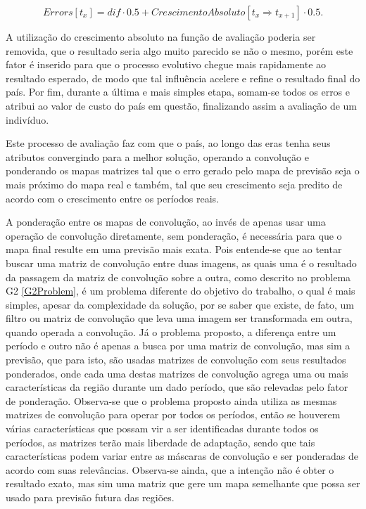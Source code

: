 \begin{equation}
\label{eq:forecastError}
	Errors[t_x] = dif \cdot 0.5 + CrescimentoAbsoluto[t_x \Rightarrow t_{x+1}] \cdot 0.5.
\end{equation}

	A utilização do crescimento absoluto na função de avaliação poderia ser removida, que o resultado seria algo muito parecido se não o mesmo, porém este fator é inserido para que o processo evolutivo chegue mais rapidamente ao resultado esperado, de modo que tal influência acelere e refine o resultado final do país. Por fim, durante a última e mais simples etapa, somam-se todos os erros e atribui ao valor de custo do país em questão, finalizando assim a avaliação de um indivíduo. 

Este processo de avaliação faz com que o país, ao longo das eras tenha seus atributos convergindo para a melhor solução, operando a convolução e ponderando os mapas matrizes tal que o erro gerado pelo mapa de previsão seja o mais próximo do mapa real e também, tal que seu crescimento seja predito de acordo com o crescimento entre os períodos reais. 

A ponderação entre os mapas de convolução, ao invés de apenas usar uma operação de convolução diretamente, sem ponderação, é necessária para que o mapa final resulte em uma previsão mais exata. Pois entende-se que ao tentar buscar uma matriz de convolução entre duas imagens, as quais uma é o resultado da passagem da matriz de convolução sobre a outra, como descrito no problema G2 \ref{G2Problem}, é um problema diferente do objetivo do trabalho, o qual é mais simples, apesar da complexidade da solução, por se saber que existe, de fato, um filtro ou matriz de convolução que leva uma imagem ser transformada em outra, quando operada a convolução. Já o problema proposto, a diferença entre um período e outro não é apenas a busca por uma matriz de convolução, mas sim a previsão, que para isto, são usadas matrizes de convolução com seus resultados ponderados, onde cada uma destas matrizes de convolução agrega uma ou mais características da região durante um dado período, que são relevadas pelo fator de ponderação. Observa-se que o problema proposto ainda utiliza as mesmas matrizes de convolução para operar por todos os períodos, então se houverem várias características que possam vir a ser identificadas durante todos os períodos, as matrizes terão mais liberdade de adaptação, sendo que tais características podem variar entre as máscaras de convolução e ser ponderadas de acordo com suas relevâncias. Observa-se ainda, que a intenção não é obter o resultado exato, mas sim uma matriz que gere um mapa semelhante que possa ser usado para previsão futura das regiões.

